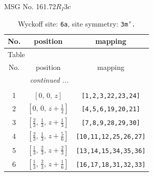 \documentclass[fleqn,8pt]{jsarticle}
\begin{document}
\setcounter{MaxMatrixCols}{32}

\renewcommand{\tablename}{Table~}
\renewcommand{\figurename}{Figure~}
\begin{center}
\LARGE
MSG No. 161.72\quad$R_{I}3c$
\end{center}
\renewcommand{\arraystretch}{1.2}
\begin{longtable}{ccc}
\caption{Wyckoff site: {\tt 6a}, site symmetry: {\tt 3m'.}}
 \\
 \hline \hline
No. & position & mapping \\ \hline \endfirsthead

\multicolumn{2}{l}{\tablename\ \thetable{}} \\
 \hline \hline
No. & position & mapping \\ \hline \endhead

 \hline \hline
\multicolumn{2}{r}{\footnotesize\it continued ...} \\ \endfoot

 \hline \hline
\multicolumn{2}{r}{} \\ \endlastfoot

1 & $\left[ 0,\, 0,\, z \right]$ & {\tt [1,2,3,22,23,24]} \\ \hline
2 & $\left[ 0,\, 0,\, z + \frac{1}{2} \right]$ & {\tt [4,5,6,19,20,21]} \\ \hline
3 & $\left[ \frac{2}{3},\, \frac{1}{3},\, z + \frac{1}{3} \right]$ & {\tt [7,8,9,28,29,30]} \\ \hline
4 & $\left[ \frac{2}{3},\, \frac{1}{3},\, z + \frac{5}{6} \right]$ & {\tt [10,11,12,25,26,27]} \\ \hline
5 & $\left[ \frac{1}{3},\, \frac{2}{3},\, z + \frac{2}{3} \right]$ & {\tt [13,14,15,34,35,36]} \\ \hline
6 & $\left[ \frac{1}{3},\, \frac{2}{3},\, z + \frac{1}{6} \right]$ & {\tt [16,17,18,31,32,33]} \\
\end{longtable}
\renewcommand{\arraystretch}{1.2}
\end{document}
